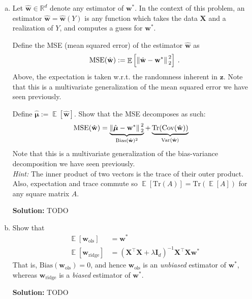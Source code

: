 \documentclass{article}
\newcommand{\mat}[1]{\mathbf{#1}}
\renewcommand{\vec}[1]{\boldsymbol{\mathbf{#1}}}
\DeclareMathOperator*{\E}{\mathbb{E}}
\newenvironment{solution}{\color{blue} \smallskip \textbf{Solution:}}{}
\begin{document}
\begin{enumerate}[(a)]
    \item 
    Let $\hat{\vec{w}} \in \mathbb{R}^{d}$ denote any estimator of $\vec{w}^*$.  In the context of this problem, an estimator $\hat{\vec{w}} = \hat{\vec{w}}(Y)$ is any function which takes the data $\mat{X}$ and a realization of $Y$, and computes a guess for $\vec{w}^*$.
    
    Define the MSE (mean squared error) of the estimator $\hat{\vec{w}}$ as
    \begin{align*}
        \mathrm{MSE}(\hat{\vec{w}}) := \E\left[\norm*{ \hat{\vec{w}} - \vec{w}^* }^2_2\right] \:.
    \end{align*}
    Above, the expectation is taken w.r.t. the randomness inherent in $\vec{z}$. Note that this is a multivariate generalization of the mean squared error we have seen previously.
    
    Define $\hat{\vec{\mu}} := \E[\hat{\vec{w}}]$. Show that the MSE decomposes as such:
    \begin{align*}
        \mathrm{MSE}(\hat{\vec{w}}) &= \underbrace{\norm*{\hat{\vec{\mu}} - \vec{w}^*}^2_2}_{\text{Bias}(\hat{\vec{w}})^2} +  \underbrace{\text{Tr}(\mathrm{Cov}(\hat{\vec{w}}))}_{\text{Var}(\hat{\vec{w}})}
    \end{align*}
    Note that this is a multivariate generalization of the bias-variance decomposition we have seen previously. \\
    \textit{Hint:} The inner product of two vectors is the trace of their outer product. Also, expectation and trace commute so $\E[\text{Tr}(A)] = \text{Tr}( \E[A] )$ for any square matrix $A$.
    
    \begin{solution}
        TODO
    \end{solution}

    \newpage
    \item
    Show that
    \begin{align*}
        \E[\vec{w}_{\text{ols}}] &= \vec{w}^* \\ 
        \E [\vec{w}_{\text{ridge}}] &= (\mat{X}^\top\mat{X} + \lambda\mat{I}_d)^{-1} \mat{X}^\top\mat{X} \vec{w}^*
    \end{align*}
    That is, $\text{Bias}(\vec{w}_{\text{ols}})=0$, and hence $\vec{w}_{\text{ols}}$ is an \emph{unbiased} estimator of $\vec{w}^*$, whereas
    $\vec{w}_{\text{ridge}}$ is a \emph{biased} estimator of $\vec{w}^*$.
    
    \begin{solution}
        TODO
    \end{solution}


\end{enumerate}
\end{document}
